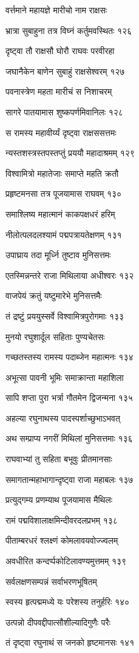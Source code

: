 वर्त्तमाने महायज्ञे मारीचो नाम राक्षसः

भ्रात्रा सुबाहुना तत्र विघ्नं कर्तुमवस्थितः १२६

दृष्ट्वा तौ राक्षसौ घोरौ राघवः परवीरहा

जघानैकेन बाणेन सुबाहुं राक्षसेश्वरम् १२७

पवनास्त्रेण महता मारीचं स निशाचरम्

सागरे पातयामास शुष्कपर्णमिवानिलः १२८

स रामस्य महावीर्य्यं दृष्ट्वा राक्षससत्तमः

न्यस्तशस्त्रस्तपस्तप्तुं प्रययौ महादाश्रमम् १२९

विश्वामित्रो महातेजाः समाप्ते महति क्रतौ

प्रहृष्टमनसा तत्र पूजयामास राघवम् १३०

समाश्लिष्य महात्मानं काकपक्षधरं हरिम्

नीलोत्पलदलश्यामं पद्मपत्रायतेक्षणम् १३१

उपाघ्राय तदा मूर्ध्नि तुष्टाव मुनिसत्तमः

एतस्मिन्नन्तरे राजा मिथिलाया अधीश्वरः १३२

वाजपेयं क्रतुं यष्टुमारेभे मुनिसत्तमैः

तं द्रष्टुं प्रययुस्सर्वे विश्वामित्रपुरोगमाः १३३

मुनयो रघुशार्दूल सहिताः पुण्यचेतसः

गच्छतस्तस्य रामस्य पदाब्जेन महात्मनः १३४

अभूत्सा पावनी भूमिः समाक्रान्ता महाशिला

सापि शप्ता पुरा भर्त्रा गौतमेन द्विजन्मना १३५

अहल्या रघुनाथस्य पादस्पर्शाच्छुभाऽभवत्

अथ सम्प्राप्य नगरीं मिथिलां मुनिसत्तमाः १३६

राघवाभ्यां तु सहिता बभूवुः प्रीतमानसाः

समागतान्महाभागान्दृष्ट्वा राजा महाबलः १३७

प्रत्युद्गम्य प्रणम्याथ पूजयामास मैथिलः

रामं पद्मविशालाक्षमिन्दीवरदलप्रभम् १३८

पीताम्बरधरं श्लक्ष्णं कोमलावयवोज्ज्वलम्

अवधीरित कन्दर्प्पकोटिलावण्यमुत्तमम् १३९

सर्वलक्षणसम्पन्नं सर्वाभरणभूषितम्

स्वस्य हृत्पद्ममध्ये यः परेशस्य तनुर्हरिः १४०

उत्पन्नो दीपवद्दीपात्सौशील्यादिगुणैः परैः

तं दृष्ट्वा रघुनाथं स जनको हृष्टमानसः १४१

